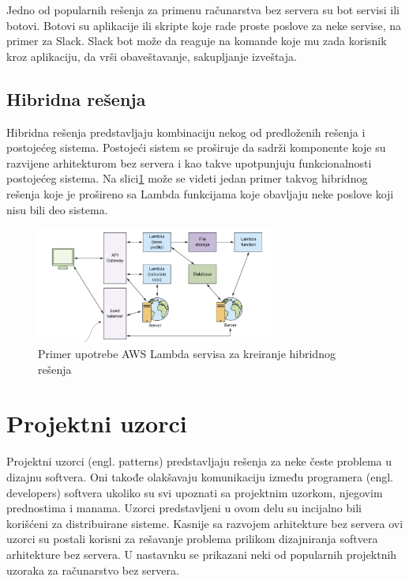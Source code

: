 \documentclass[12pt,oneside]{memoir}
\begin{document}
Jedno od popularnih rešenja za primenu računarstva bez servera su bot servisi ili botovi. Botovi su aplikacije ili skripte koje rade proste poslove za neke servise, na primer za Slack. Slack bot može da reaguje na komande koje mu zada korisnik kroz aplikaciju, da vrši obaveštavanje, sakupljanje izveštaja. 

\subsection{Hibridna rešenja}

Hibridna rešenja predstavljaju kombinaciju nekog od predloženih rešenja i postojećeg sistema. Postojeći sistem se proširuje da sadrži komponente koje su razvijene arhitekturom bez servera i kao takve upotpunjuju funkcionalnosti postojećeg sistema. Na slici\ref{fig:HibridnoResenje} može se videti jedan primer takvog hibridnog rešenja koje je prošireno sa Lambda funkcijama koje obavljaju neke poslove koji nisu bili deo sistema.

\begin{figure}[!ht]
  \centering
  \includegraphics[width=0.7\textwidth]{Slika 10.png}
  \caption{Primer upotrebe AWS Lambda servisa za kreiranje hibridnog rešenja}
  \label{fig:HibridnoResenje}
\end{figure}

\section{Projektni uzorci}

Projektni uzorci (engl. patterns) predstavljaju rešenja za neke česte problema u dizajnu softvera. Oni takođe olakšavaju komunikaciju između programera (engl. developers) softvera ukoliko su svi upoznati sa projektnim uzorkom, njegovim prednostima i manama. Uzorci predstavljeni u ovom delu su incijalno bili korišćeni za distribuirane sisteme. Kasnije sa razvojem arhitekture bez servera ovi uzorci su postali korisni za rešavanje problema prilikom dizajniranja softvera arhitekture bez servera\cite{sa}. U nastavnku se prikazani neki od popularnih projektnih uzoraka za računarstvo bez servera.
\end{document}
